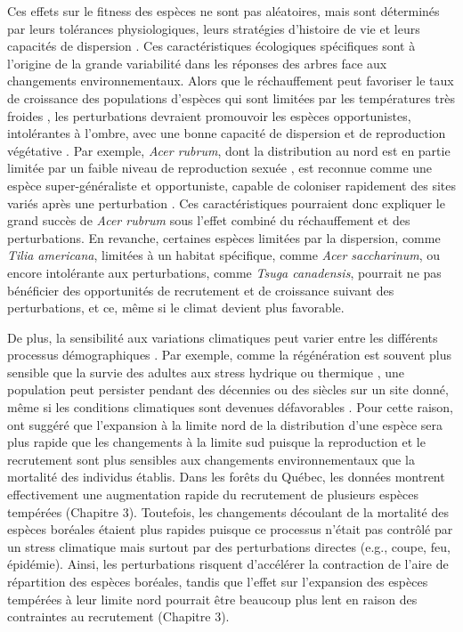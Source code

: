 Ces effets sur le fitness des espèces ne sont pas aléatoires, mais sont
déterminés par leurs tolérances physiologiques, leurs stratégies
d'histoire de vie et leurs capacités de dispersion
\citep{aubin_traits_2016, estrada_species_2015}. Ces caractéristiques
écologiques spécifiques sont à l'origine de la grande variabilité dans
les réponses des arbres face aux changements environnementaux. Alors que
le réchauffement peut favoriser le taux de croissance des populations
d'espèces qui sont limitées par les températures très froides
\citep{de_frenne_microclimate_2013, devictor_birds_2008}, les
perturbations devraient promouvoir les espèces opportunistes,
intolérantes à l'ombre, avec une bonne capacité de dispersion et de
reproduction végétative \citep{danneyrolles_stronger_2019}. Par exemple,
\emph{Acer rubrum}, dont la distribution au nord est en partie limitée
par un faible niveau de reproduction sexuée
\citep{tremblay_potential_2002}, est reconnue comme une espèce
super-généraliste et opportuniste, capable de coloniser rapidement des
sites variés après une perturbation
\citep{abrams_red_1998, fei_rapid_2009}. Ces caractéristiques pourraient
donc expliquer le grand succès de \emph{Acer rubrum} sous l'effet
combiné du réchauffement et des perturbations. En revanche, certaines
espèces limitées par la dispersion, comme \emph{Tilia americana},
limitées à un habitat spécifique, comme \emph{Acer saccharinum}, ou
encore intolérante aux perturbations, comme \emph{Tsuga canadensis},
pourrait ne pas bénéficier des opportunités de recrutement et de
croissance suivant des perturbations, et ce, même si le climat devient
plus favorable.

De plus, la sensibilité aux variations climatiques peut varier entre les
différents processus démographiques \citep{niinemets_responses_2010}.
Par exemple, comme la régénération est souvent plus sensible que la
survie des adultes aux stress hydrique ou thermique
\citep{niinemets_responses_2010}, une population peut persister pendant
des décennies ou des siècles sur un site donné, même si les conditions
climatiques sont devenues défavorables \citep{talluto_extinction_2017}.
Pour cette raison, \citet{jump_altitude-for-latitude_2009} ont suggéré
que l'expansion à la limite nord de la distribution d'une espèce sera
plus rapide que les changements à la limite sud puisque la reproduction
et le recrutement sont plus sensibles aux changements environnementaux
que la mortalité des individus établis. Dans les forêts du Québec, les
données montrent effectivement une augmentation rapide du recrutement de
plusieurs espèces tempérées (Chapitre 3). Toutefois, les changements
découlant de la mortalité des espèces boréales étaient plus rapides
puisque ce processus n'était pas contrôlé par un stress climatique mais
surtout par des perturbations directes (e.g., coupe, feu, épidémie).
Ainsi, les perturbations risquent d'accélérer la contraction de l'aire
de répartition des espèces boréales, tandis que l'effet sur l'expansion
des espèces tempérées à leur limite nord pourrait être beaucoup plus
lent en raison des contraintes au recrutement (Chapitre 3).

